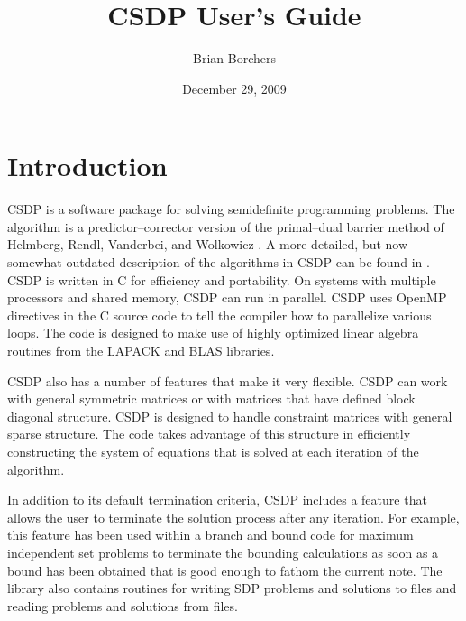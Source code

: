 \documentclass{article}
\begin{document}
%
%
%
%

\newcommand{\elprod}{\circ}

\title{CSDP User's Guide}
\date{December 29, 2009}
\author{Brian Borchers}
\maketitle
\section*{Introduction}
CSDP is a software package for solving semidefinite programming
problems.  The algorithm is a predictor--corrector version of the
primal--dual barrier method of Helmberg, Rendl, Vanderbei, and
Wolkowicz \cite{HelmbergC:Anims}.  A more detailed, but now somewhat
outdated description of the algorithms in CSDP can be found in
\cite{BorchersB:CSDCls}.  CSDP is written in C for efficiency and
portability.  On systems with multiple processors and shared memory,
CSDP can run in parallel.  CSDP uses OpenMP directives in the C source
code to tell the compiler how to parallelize various loops.  The code
is designed to make use of highly optimized linear algebra routines
from the LAPACK and BLAS libraries.

CSDP also has a number of features that make it very flexible.  CSDP
can work with general symmetric matrices or with matrices that have
defined block diagonal structure.  CSDP is designed to handle
constraint matrices with general sparse structure.  The code takes
advantage of this structure in efficiently constructing the system of
equations that is solved at each iteration of the algorithm.  

In addition to its default termination criteria, CSDP includes a
feature that allows the user to terminate the solution process after
any iteration.  For example, this feature has been used within a
branch and bound code for maximum independent set problems to
terminate the bounding calculations as soon as a bound has been
obtained that is good enough to fathom the current note.  The library
also contains routines for writing SDP problems and solutions to files
and reading problems and solutions from files.
\end{document}
